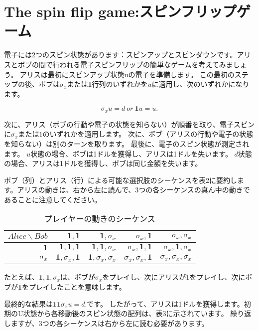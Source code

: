 \section{The spin flip game:スピンフリップゲーム}


電子には2つのスピン状態があります：スピンアップとスピンダウンです。アリスとボブの間で行われる電子スピンフリップの簡単なゲームを考えてみましょう。
アリスは最初にスピンアップ状態uの電子を準備します。 この最初のステップの後、ボブは$\sigma_x$または$\mathbf{1}$行列のいずれかを$u$に適用し、次のいずれかになります。

\begin{equation}
\label{16}
\sigma_x u = d
\ or \ 
\mathbf{1}u = u.
\end{equation}

次に、アリス（ボブの行動や電子の状態を知らない）が順番を取り、電子スピンに$\sigma_x$または$1$のいずれかを適用します。
次に、ボブ（アリスの行動や電子の状態を知らない）は別のターンを取ります。 最後に、電子のスピン状態が測定されます。
$u$状態の場合、ボブは1ドルを獲得し、アリスは1ドルを失います。 $d$状態の場合、アリスは1ドルを獲得し、ボブは同じ金額を失います。

ボブ（列）とアリス（行）による可能な選択肢のシーケンスを表2に要約します。アリスの動きは、右から左に読んで、3つの各シーケンスの真ん中の動きであることに注意してください。

\begin{table}[htb]
\caption{プレイヤーの動きのシーケンス}
\centering
  \begin{tabular}{|r||r|r|r|r|} \hline
    $Alice \backslash Bob$ & $\mathbf{1}, \mathbf{1}$  &  $\mathbf{1}, \sigma_x $  & $ \sigma_x,\mathbf{1} $ & $\sigma_x, \sigma_x $  \\ \hline \hline
    $\mathbf{1}$ & $\mathbf{1}, \mathbf{1},\mathbf{1}$ & $\mathbf{1}, \mathbf{1},\sigma_x$ & $\sigma_x, \mathbf{1},\mathbf{1}$ & $\sigma_x, \mathbf{1},\sigma_x$ \\
    $\sigma_x$ & $\mathbf{1}, \sigma_x,\mathbf{1}$ & $ \mathbf{1}, \sigma_x,\sigma_x$ & $\sigma_x, \sigma_x,\mathbf{1}$ & $\sigma_x, \sigma_x,\sigma_x$\\ \hline
  \end{tabular}
\end{table}


たとえば、$\mathbf{1},\mathbf{1}, \sigma_x$は、ボブが$\sigma_x$をプレイし、次にアリスが1をプレイし、次にボブが$\mathbf{1}$をプレイしたことを意味します。

最終的な結果は$\mathbf{11} \sigma_x u = d.$です。 
したがって、アリスは1ドルを獲得します。初期のU状態から各移動後のスピン状態の配列は、表3に示されています。 繰り返しますが、3つの各シーケンスは右から左に読む必要があります。

